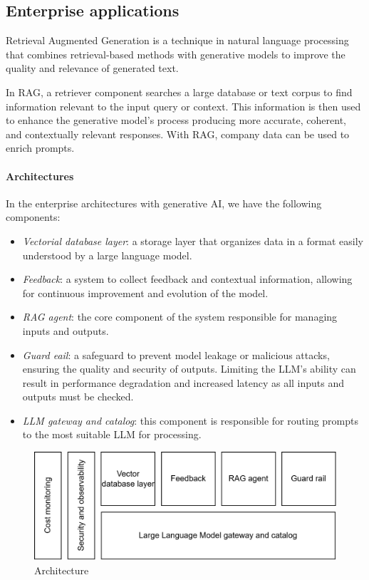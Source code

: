 \subsection{Enterprise applications}
\begin{definition}
    Retrieval Augmented Generation is a technique in natural language processing that combines retrieval-based methods with generative models to improve the quality and relevance of generated text.
\end{definition}
\noindent In RAG, a retriever component searches a large database or text corpus to find information relevant to the input query or context.
This information is then used to enhance the generative model's process producing more accurate, coherent, and contextually relevant responses. 
With RAG, company data can be used to enrich prompts. 

\paragraph*{Architectures}
\noindent In the enterprise architectures with generative AI, we have the following components:
\begin{itemize}
    \item \textit{Vectorial database layer}: a storage layer that organizes data in a format easily understood by a large language model.
    \item \textit{Feedback}: a system to collect feedback and contextual information, allowing for continuous improvement and evolution of the model.
    \item \textit{RAG agent}: the core component of the system responsible for managing inputs and outputs.
    \item \textit{Guard eail}: a safeguard to prevent model leakage or malicious attacks, ensuring the quality and security of outputs. 
        Limiting the LLM's ability can result in performance degradation and increased latency as all inputs and outputs must be checked.
    \item \textit{LLM gateway and catalog}: this component is responsible for routing prompts to the most suitable LLM for processing.
\end{itemize}

\begin{figure}[H]
    \centering
    \includegraphics[width=0.5\linewidth]{images/bis14.png}
    \caption{Architecture}
\end{figure}